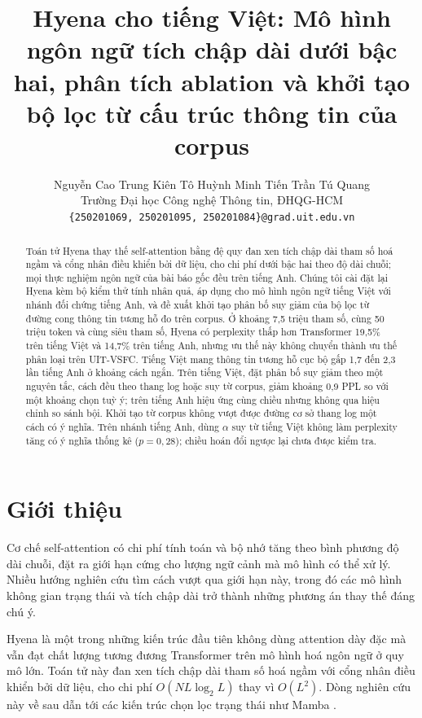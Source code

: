 \documentclass[11pt]{article}
\title{Hyena cho tiếng Việt: Mô hình ngôn ngữ tích chập dài dưới bậc hai,
phân tích ablation và khởi tạo bộ lọc từ cấu trúc thông tin của corpus}
\author{
  Nguyễn Cao Trung Kiên \quad Tô Huỳnh Minh Tiến \quad Trần Tú Quang \\
  Trường Đại học Công nghệ Thông tin, ĐHQG-HCM \\
  \texttt{\{250201069, 250201095, 250201084\}@grad.uit.edu.vn}
}
\begin{document}
\maketitle

\begin{abstract}
Toán tử Hyena \citep{poli2023hyena} thay thế self-attention bằng đệ quy đan xen
tích chập dài tham số hoá ngầm và cổng nhân điều khiển bởi dữ liệu, cho chi phí
dưới bậc hai theo độ dài chuỗi; mọi thực nghiệm ngôn ngữ của bài báo gốc đều
trên tiếng Anh. Chúng tôi cài đặt lại Hyena kèm bộ kiểm thử tính nhân quả, áp
dụng cho mô hình ngôn ngữ tiếng Việt với nhánh đối chứng tiếng Anh, và đề xuất
khởi tạo phân bố suy giảm của bộ lọc từ đường cong thông tin tương hỗ đo trên
corpus. Ở khoảng 7,5 triệu tham số, cùng 50 triệu token và cùng siêu tham số,
Hyena có perplexity thấp hơn Transformer 19,5\% trên tiếng Việt và 14,7\% trên
tiếng Anh, nhưng ưu thế này không chuyển thành ưu thế phân loại trên UIT-VSFC.
Tiếng Việt mang thông tin tương hỗ cục bộ gấp 1,7 đến 2,3 lần
tiếng Anh ở khoảng cách ngắn. Trên tiếng Việt, đặt phân bố suy giảm theo một
nguyên tắc, cách đều theo thang log hoặc suy từ corpus, giảm khoảng 0,9 PPL so
với một khoảng chọn tuỳ ý; trên tiếng Anh hiệu ứng cùng chiều nhưng không qua
hiệu chỉnh so sánh bội. Khởi tạo từ corpus không vượt được đường cơ sở thang
log một cách có ý nghĩa. Trên nhánh tiếng Anh, dùng $\alpha$ suy từ tiếng Việt
không làm perplexity tăng có ý nghĩa thống kê ($p = 0{,}28$); chiều hoán đổi
ngược lại chưa được kiểm tra.
\end{abstract}

\section{Giới thiệu}

Cơ chế self-attention \citep{vaswani2017attention} có chi phí tính toán và bộ
nhớ tăng theo bình phương độ dài chuỗi, đặt ra giới hạn cứng cho lượng ngữ cảnh
mà mô hình có thể xử lý. Nhiều hướng nghiên cứu tìm cách vượt qua giới hạn này,
trong đó các mô hình không gian trạng thái \citep{gu2021s4, mehta2022gss,
dao2023h3} và tích chập dài trở thành những phương án thay thế đáng chú ý.

Hyena \citep{poli2023hyena} là một trong những kiến trúc đầu tiên không dùng
attention dày đặc mà vẫn đạt chất lượng tương đương Transformer trên mô hình
hoá ngôn ngữ ở quy mô lớn. Toán tử này đan xen tích chập dài tham số hoá ngầm
với cổng nhân điều khiển bởi dữ liệu, cho chi phí $O(N L \log_2 L)$ thay vì
$O(L^2)$. Dòng nghiên cứu này về sau dẫn tới các kiến trúc chọn lọc trạng thái
như Mamba \citep{gu2023mamba}.
\end{document}
